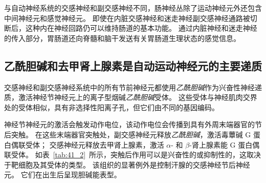 与自动神经系统的交感神经和副交感神经不同，肠神经丛除了运动神经元外还包含中间神经元和感觉神经元。
即使在内脏交感神经和迷走神经副交感神经通路被切断后，这种内在神经回路仍可以维持肠道的基本功能。
通过内脏神经和迷走神经的传入部分，胃肠道还向脊髓和脑干发送有关胃肠道生理状态的感觉信息。



\subsection{乙酰胆碱和去甲肾上腺素是自动运动神经元的主要递质}

交感神经和副交感神经系统中的所有节前神经元都使用\textit{乙酰胆碱}作为兴奋性神经递质，激活神经节神经元上的离子型烟碱\textit{乙酰胆碱}受体。
这些受体与神经肌肉交界处的受体相似，具有非选择性阳离子孔，但它们由不同的基因编码。


神经节神经元的激活会触发动作电位，该动作电位会传播到具有外周末端器官的节后突触。
在这些末端器官突触处，副交感神经元释放\textit{乙酰胆碱}，激活毒蕈碱 G 蛋白偶联受体；
交感神经元释放去甲肾上腺素，激活 $\alpha$- 和 $\beta$-肾上腺素能 G 蛋白偶联受体。
如表~\ref{tab:41_2}~所示，突触后作用可以是兴奋性的或抑制性的，这取决于靶细胞及其受体的类型。
该组织的显著例外是控制汗腺的交感神经节后神经元。
它们在出生后呈现胆碱能表型。


